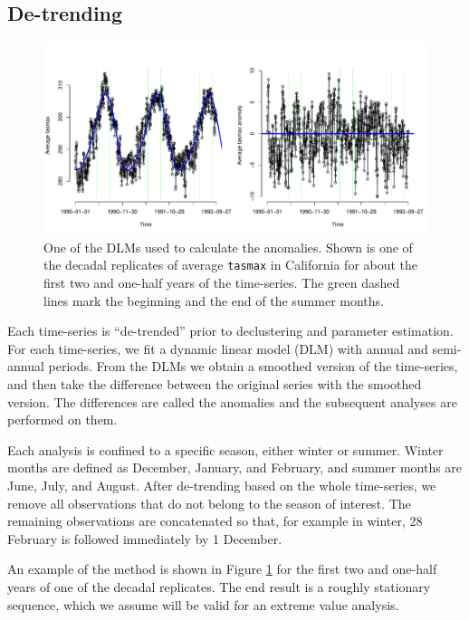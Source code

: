 \documentclass[12pt]{article}
\begin{document}
\subsection{De-trending}
\label{anomaly}

\begin{figure}
\begin{center}
\includegraphics[scale=0.50]{figs/dlm.pdf}
\end{center}
\caption{One of the DLMs used to calculate the anomalies. Shown is one of the decadal replicates of average \texttt{tasmax} in California for about the first two and one-half years of the time-series. The green dashed lines mark the beginning and the end of the summer months.}
\label{dlm}
\end{figure}

Each time-series is ``de-trended'' prior to declustering and parameter estimation. For each time-series, we fit a dynamic linear model (DLM) with annual and semi-annual periods. From the DLMs we obtain a smoothed version of the time-series, and then take the difference between the original series with the smoothed version. The differences are called the anomalies and the subsequent analyses are performed on them. 

Each analysis is confined to a specific season, either winter or summer. Winter months are defined as December, January, and February, and summer months are June, July, and August. After de-trending based on the whole time-series, we remove all observations that do not belong to the season of interest. The remaining observations are concatenated so that, for example in winter, 28 February is followed immediately by 1 December.

An example of the method is shown in Figure \ref{dlm} for the first two and one-half years of one of the decadal replicates. The end result is a roughly stationary sequence, which we assume will be valid for an extreme value analysis.
 
\end{document}
